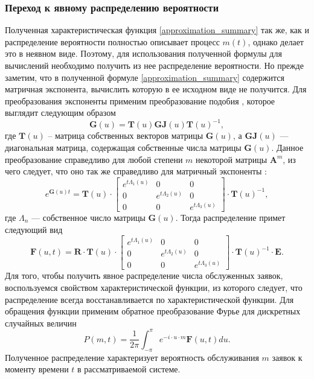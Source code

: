 \subsubsection{Переход к явному распределению вероятности}
Полученная характеристическая функция \eqref{approximation_summary} так же, как и распределение вероятности полностью описывает процесс $m(t)$, однако делает это в неявном виде. Поэтому, для использования полученной формулы для вычислений необходимо получить из нее распределение вероятности.
Но прежде заметим, что в полученной формуле \eqref{approximation_summary} содержится матричная экспонента, вычислить которую в ее исходном виде не получится. Для преобразования экспоненты применим преобразование подобия \cite{bronson1991matrix}, которое выглядит следующим образом
\begin{equation*}
	\boldsymbol{G}(u) =\boldsymbol{T}(u)\boldsymbol{GJ}(u)\boldsymbol{T}(u)^{-1},
\end{equation*}
где $\boldsymbol{T}(u)$ – матрица собственных векторов матрицы $\boldsymbol{G}(u)$, а $\boldsymbol{GJ}(u)$ --- диагональная матрица, содержащая собственные числа матрицы $\boldsymbol{G}(u)$. Данное преобразование справедливо для любой степени $m$ некоторой матрицы $\boldsymbol{A}^{m}$, из чего следует, что оно так же справедливо для матричный экспоненты \cite{egorov2006prog}:
\begin{equation*}
	e^{\boldsymbol{G}(u)t}=\boldsymbol{T}(u)\cdot \begin{bmatrix}
		e^{t \Lambda_{1}(u)} & 0 &  0\\
		0 & e^{t \Lambda_{2}(u)} & 0\\
		0 & 0 &	e^{t \Lambda_{3}(u)}
	\end{bmatrix} \cdot \boldsymbol{T}(u)^{-1},
\end{equation*}
где $\Lambda_{n}$ --- собственное число матрицы $\boldsymbol{G}(u)$. Тогда распределение примет следующий вид
\begin{equation*}
	\boldsymbol{F}(u,t)=\boldsymbol{R} \cdot \boldsymbol{T}(u)\cdot \begin{bmatrix}
		e^{t \Lambda_{1}(u)} & 0 &  0\\
		0 & e^{t \Lambda_{2}(u)} & 0\\
		0 & 0 &	e^{t \Lambda_{3}(u)}
	\end{bmatrix} \cdot \boldsymbol{T}(u)^{-1} \cdot \boldsymbol{E}.
\end{equation*}
Для того, чтобы получить явное распределение числа обслуженных заявок, воспользуемся свойством характеристической функции, из которого следует, что распределение всегда восстанавливается по характеристической функции. Для обращения функции применим обратное преобразование Фурье для дискретных случайных величин
\begin{equation*}
	P(m,t) = \dfrac{1}{2\pi}\int_{-\pi}^{\pi} e^{-i \cdot u \cdot m} \boldsymbol{F}(u,t)du.
\end{equation*}
Полученное распределение характеризует вероятность обслуживания $m$ заявок к моменту времени $t$ в рассматриваемой системе.
\clearpage